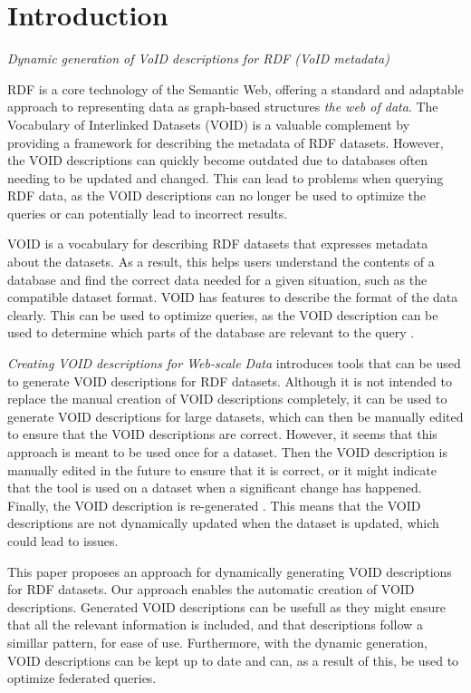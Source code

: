 \section{Introduction}\label{sec:introduction2}
\emph{Dynamic generation of VoID descriptions for RDF (VoID metadata)}

RDF is a core technology of the Semantic Web, offering a standard and adaptable approach to representing data as graph-based structures \emph{the web of data}. The Vocabulary of Interlinked Datasets (VOID) is a valuable complement by providing a framework for describing the metadata of RDF datasets. However, the VOID descriptions can quickly become outdated due to databases often needing to be updated and changed. This can lead to problems when querying RDF data, as the VOID descriptions can no longer be used to optimize the queries or can potentially lead to incorrect results.

VOID is a vocabulary for describing RDF datasets that expresses metadata about the datasets. As a result, this helps users understand the contents of a database and find the correct data needed for a given situation, such as the compatible dataset format. VOID has features to describe the format of the data clearly. This can be used to optimize queries, as the VOID description can be used to determine which parts of the database are relevant to the query .  

\emph{Creating VOID descriptions for Web-scale Data} introduces tools that can be used to generate VOID descriptions for RDF datasets. Although it is not intended to replace the manual creation of VOID descriptions completely, it can be used to generate VOID descriptions for large datasets, which can then be manually edited to ensure that the VOID descriptions are correct. However, it seems that this approach is meant to be used once for a dataset. Then the VOID description is manually edited in the future to ensure that it is correct, or it might indicate that the tool is used on a dataset when a significant change has happened. Finally, the VOID description is re-generated . This means that the VOID descriptions are not dynamically updated when the dataset is updated, which could lead to issues.

This paper proposes an approach for dynamically generating VOID descriptions for RDF datasets. Our approach enables the automatic creation of VOID descriptions. Generated VOID descriptions can be usefull as they might ensure that all the relevant information is included, and that descriptions follow a simillar pattern, for ease of use. Furthermore, with the dynamic generation, VOID descriptions can be kept up to date and can, as a result of this, be used to optimize federated queries. 



